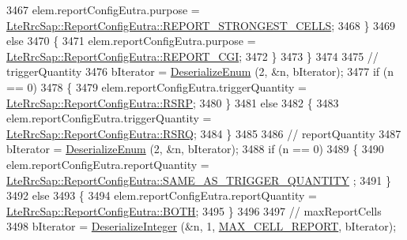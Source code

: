 \begin{DoxyCode}
3467                       elem.reportConfigEutra.purpose = 
      \hyperlink{structns3_1_1LteRrcSap_1_1ReportConfigEutra_a2587c7b064e40788add4c94395026700a448602bbc7d0d7ba4d5c27833c2ca041}{LteRrcSap::ReportConfigEutra::REPORT\_STRONGEST\_CELLS};
3468                     \}
3469                   \textcolor{keywordflow}{else}
3470                     \{
3471                       elem.reportConfigEutra.purpose = 
      \hyperlink{structns3_1_1LteRrcSap_1_1ReportConfigEutra_a2587c7b064e40788add4c94395026700a24c9629d34a67112c58eaf8949d06c65}{LteRrcSap::ReportConfigEutra::REPORT\_CGI};
3472                     \}
3473                 \}
3474 
3475               \textcolor{comment}{// triggerQuantity}
3476               bIterator = \hyperlink{classns3_1_1Asn1Header_a4fcc253e0eec3483c775b005c1875f2d}{DeserializeEnum} (2, &n, bIterator);
3477               \textcolor{keywordflow}{if} (n == 0)
3478                 \{
3479                   elem.reportConfigEutra.triggerQuantity = 
      \hyperlink{structns3_1_1LteRrcSap_1_1ReportConfigEutra_a82343ddf526faba0483431ea5882a3efa5b7591e86ab7bcefc7fe1528762114d7}{LteRrcSap::ReportConfigEutra::RSRP};
3480                 \}
3481               \textcolor{keywordflow}{else}
3482                 \{
3483                   elem.reportConfigEutra.triggerQuantity = 
      \hyperlink{structns3_1_1LteRrcSap_1_1ReportConfigEutra_a82343ddf526faba0483431ea5882a3efaa4e09cb3c7154d7ab732115a2647325f}{LteRrcSap::ReportConfigEutra::RSRQ};
3484                 \}
3485 
3486               \textcolor{comment}{// reportQuantity}
3487               bIterator = \hyperlink{classns3_1_1Asn1Header_a4fcc253e0eec3483c775b005c1875f2d}{DeserializeEnum} (2, &n, bIterator);
3488               \textcolor{keywordflow}{if} (n == 0)
3489                 \{
3490                   elem.reportConfigEutra.reportQuantity = 
      \hyperlink{structns3_1_1LteRrcSap_1_1ReportConfigEutra_a6d641a71ebc481d2eb99359e72e9ea40a8d1efc27a4f5f4d31da331b3be437072}{LteRrcSap::ReportConfigEutra::SAME\_AS\_TRIGGER\_QUANTITY}
      ;
3491                 \}
3492               \textcolor{keywordflow}{else}
3493                 \{
3494                   elem.reportConfigEutra.reportQuantity = 
      \hyperlink{structns3_1_1LteRrcSap_1_1ReportConfigEutra_a6d641a71ebc481d2eb99359e72e9ea40a71890e01bc4f9caba54f12180edbaa90}{LteRrcSap::ReportConfigEutra::BOTH};
3495                 \}
3496 
3497               \textcolor{comment}{// maxReportCells}
3498               bIterator = \hyperlink{classns3_1_1Asn1Header_a49802c9af30018b078150e866b6ecae2}{DeserializeInteger} (&n, 1, 
      \hyperlink{lte-rrc-header_8cc_a0a29c59f448f689482054e43277599ab}{MAX\_CELL\_REPORT}, bIterator);

\end{DoxyCode}
